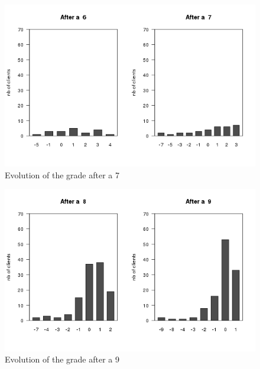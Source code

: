 \documentclass[a4paper, 11pt]{article}
\begin{document}
        \begin{figure}[!ht]
                \centering
                \includegraphics[height = 10 cm]{Remi/Evolution_of_the_grade_after_a_7.png}
                \caption{Evolution of the grade after a 7}
                \label{fig:e_7}
        \end{figure}

        \begin{figure}[!ht]
                \centering
                \includegraphics[height = 10 cm]{Remi/Evolution_of_the_grade_after_a_9.png}
                \caption{Evolution of the grade after a 9}
                \label{fig:e_9}
        \end{figure}
\end{document}
